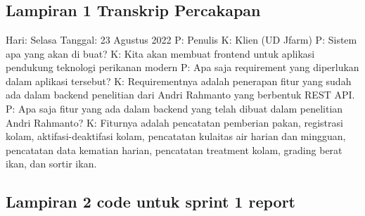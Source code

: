 \setcounter{section}{0}
\chapter*{}

\section{Lampiran 1 Transkrip Percakapan}
\begin{flushleft}
Hari: Selasa
\linebreak
Tanggal: 23 Agustus 2022
\linebreak
P: Penulis
\linebreak
K: Klien (UD Jfarm)
\linebreak
\linebreak
P: Sistem apa yang akan di buat?
\linebreak
K: Kita akan membuat frontend untuk aplikasi pendukung teknologi perikanan modern
\linebreak
P: Apa saja requirement yang diperlukan dalam aplikasi tersebut?
\linebreak
K: Requirementnya adalah penerapan fitur yang sudah ada dalam backend penelitian dari Andri Rahmanto yang berbentuk REST API.
\linebreak
P: Apa saja fitur yang ada dalam backend yang telah dibuat dalam penelitian Andri Rahmanto?
\linebreak
K: Fiturnya adalah pencatatan pemberian pakan, registrasi kolam, aktifasi-deaktifasi kolam, pencatatan kulaitas air harian dan mingguan, pencatatan data kematian harian, pencatatan treatment kolam, grading berat ikan, dan sortir ikan.
\linebreak
\end{flushleft}



\clearpage
\section{Lampiran 2 code untuk sprint 1 report}

